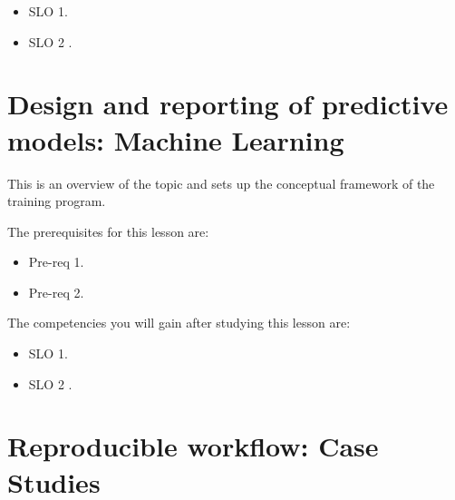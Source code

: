 \begin{itemize}
    \item SLO 1.
\end{itemize}

\begin{itemize}
    \item SLO 2 .
\end{itemize}

\section{Design and reporting of predictive models: Machine Learning}
\label{sec:design-and-reporting-of-predictive-models-machine-learning}

This is an overview of the topic and sets up the conceptual framework of the training program.




The prerequisites for this lesson are: 




\begin{itemize}
    \item Pre-req 1.
\end{itemize}

\begin{itemize}
    \item Pre-req 2.
\end{itemize}




The competencies you will gain after studying this lesson are: 




\begin{itemize}
    \item SLO 1.
\end{itemize}

\begin{itemize}
    \item SLO 2 .
\end{itemize}

\section{Reproducible workflow: Case Studies}
\label{sec:reproducible-workflow-case-studies}

